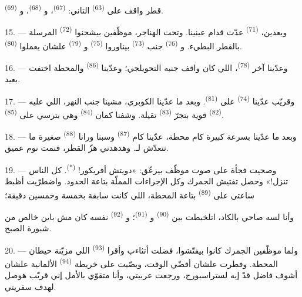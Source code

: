 قطر واقف على  \textsuperscript{(63)} التاني: 
\textsuperscript{(67)}، و \textsuperscript{(68)}، و \textsuperscript{(69)}.

15. --- وبعدين،  \textsuperscript{(71)} عدّت قدام عينينا. وتحت
الهناجر، موظّفين بيشحنوا  \textsuperscript{(72)} المرسلة بالقطر
البطيء. و \textsuperscript{(76)} جنب 
\textsuperscript{(73)} بيناوروا  \textsuperscript{(75)}
و \textsuperscript{(79)} علشان يعملوا 
\textsuperscript{(80)}.

16. --- وعدّينا آخر  \textsuperscript{(78)}، اللي كان واقف جنبه
التحويلجي؛ وعدّينا  \textsuperscript{(86)} والمحطة اختفت بعيد.

17. --- وقريّب عدّينا  \textsuperscript{(74)} على
 \textsuperscript{(81)}. وبعد ما عدّينا الكوبري، مشينا جنب النهر،
اللي عليه  \textsuperscript{(82)} قوية بتجرّ 
\textsuperscript{(83)} تقيلة. وشفنا كمان  \textsuperscript{(84)}
وهي بترسي على  \textsuperscript{(85)}.

18. --- وبعد ما عدّينا بسرعة كبيرة كام محطة، عدّينا كام 
\textsuperscript{(87)} وسبنا ورانا  \textsuperscript{(88)} صغيرة ما
تتعدّش لـ. وهدهدني هزّ القطر، فنمت نوم عميق.

\VUsaut{3.0mm}
\VUsaut{3.0mm}

19. --- وصحيت فجأة على صوت موظّف بيزعّق: «دويتش أفريكور!
\textsuperscript{(*)}. كل الناس تنزل!» وحصل تفتيش الجمرك وكل الإجراءات المملّة
بتاعة الحدود. واضطرّيت أظبط ساعتي على  \textsuperscript{(89)}
بتاعة المحطة، اللي كانت سابقة بخمسة وخمسين دقيقة؛

وأنا لسه صاحي بالكاد، اتلخبطت بين  \textsuperscript{(90)}
و \textsuperscript{(91)}؛ و \textsuperscript{(92)} نفسه
كان مش باين خالص من شبورة الصبح.

20. --- ولما موظّفين الجمرك كانوا بيفتّشوا، فضلت أتثاءب وأقرا 
\textsuperscript{(93)} اللي مزيّنة حيطان المحطة. وفطرت علشان أقضّي الوقت، وبصّيت
على خريطة  \textsuperscript{(94)} الألمانية علشان أشوف فاضل قدّ إيه
لستراسبورج، ورجعت عربيتي، وأنا متقوّي بالأمل إني قريّب هوصل لهدف سفريتي.

\VUsaut{6.0mm}
\VUfilet{22mm}
